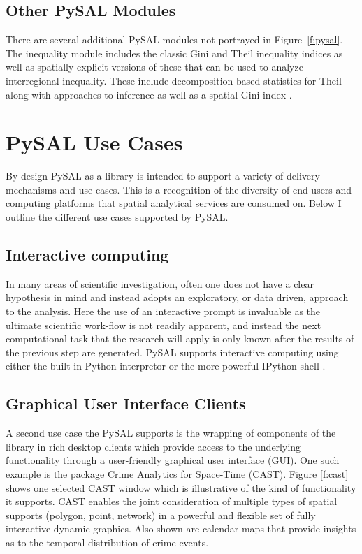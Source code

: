 \documentclass[11pt, titlepage]{article}
\begin{document}
\subsection{Other PySAL Modules}
There are several additional PySAL modules not portrayed in 
Figure~\ref{f:pysal}. The inequality module includes the classic Gini
and Theil inequality indices as well as spatially explicit versions of
these that can be used to analyze interregional inequality. These
include decomposition based statistics for Theil along with approaches
to inference \citep{Rey:2004ew}
as well as a spatial Gini index \citep{Rey:2012aa}.



\section{PySAL Use Cases}

By design PySAL as a library is intended to support a variety of
delivery mechanisms and use cases. This is a recognition of the
diversity of end users and computing platforms that spatial analytical
services are consumed on. Below I outline the different use cases
supported by PySAL.


\subsection{Interactive computing}

In many areas of scientific investigation, often one does not have a
clear hypothesis in mind and instead adopts an exploratory, or data
driven, approach to the analysis. Here the use of an interactive prompt
is invaluable as the ultimate scientific work-flow is not readily
apparent, and instead the next computational task that the research
will apply is only known after the results of the previous step are
generated. PySAL supports interactive computing using either the built
in Python interpretor or the more powerful IPython shell \cite{Perez:2007kq}.

\subsection{Graphical User Interface Clients}

A second use case the PySAL supports is the wrapping of components of
the library in rich desktop clients which provide access to the
underlying functionality through a user-friendly graphical user
interface (GUI). One such example is the package Crime Analytics for
Space-Time (CAST). Figure \ref{f:cast} shows one selected CAST window
which is illustrative of the kind of functionality it supports. CAST
enables the joint consideration of multiple types of spatial supports
(polygon, point, network) in a powerful and flexible set of fully
interactive dynamic graphics. Also shown are calendar maps that provide
insights as to the temporal distribution of crime events.
\end{document}
